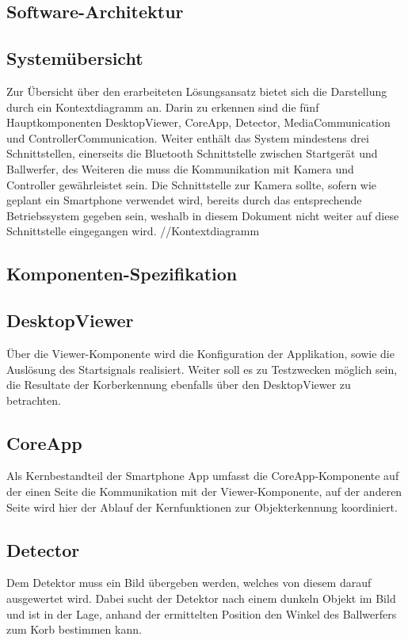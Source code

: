 \subsection{Software-Architektur}
	\subsection{Systemübersicht}
	Zur Übersicht über den erarbeiteten Lösungsansatz bietet sich die Darstellung durch ein Kontextdiagramm an. Darin zu erkennen sind die fünf Hauptkomponenten  DesktopViewer, CoreApp, Detector, MediaCommunication und ControllerCommunication. Weiter enthält das System mindestens drei Schnittstellen, einerseits die Bluetooth Schnittstelle zwischen Startgerät und Ballwerfer, des Weiteren die muss die Kommunikation mit Kamera und Controller gewährleistet sein. Die Schnittstelle zur Kamera sollte, sofern wie geplant ein Smartphone verwendet wird, bereits durch das entsprechende Betriebssystem gegeben sein, weshalb in diesem Dokument nicht weiter auf diese Schnittstelle eingegangen wird.
	//Kontextdiagramm
	
	\subsection{Komponenten-Spezifikation}
		\subsection{DesktopViewer}
		Über die Viewer-Komponente wird die Konfiguration der Applikation, sowie die Auslösung des Startsignals realisiert. Weiter soll es zu Testzwecken möglich sein, die Resultate der Korberkennung ebenfalls über den DesktopViewer zu betrachten.
		
		\subsection{CoreApp}
		Als Kernbestandteil der Smartphone App umfasst die CoreApp-Komponente auf der einen Seite die Kommunikation mit der Viewer-Komponente, auf der anderen Seite wird hier der Ablauf der Kernfunktionen zur Objekterkennung koordiniert.
		
		\subsection{Detector}
		Dem Detektor muss ein Bild übergeben werden, welches von diesem darauf ausgewertet wird. Dabei sucht der Detektor nach einem dunkeln Objekt im Bild und ist in der Lage, anhand der ermittelten Position den Winkel des Ballwerfers zum Korb bestimmen kann.
		
